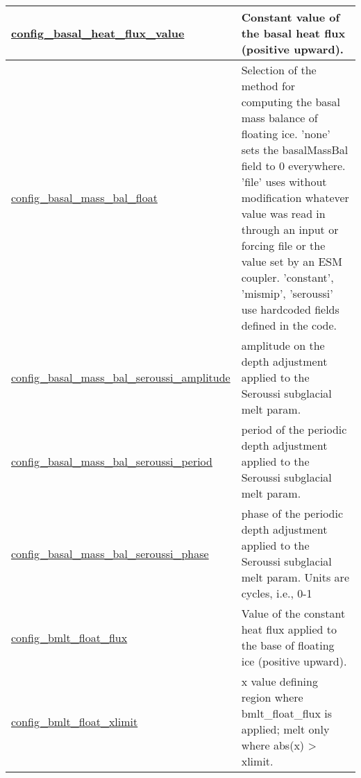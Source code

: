 {\begin{center}
\begin{longtable}{| p{2.0in} || p{4.0in} |}
    \hline
    \hyperref[subsec:nm_sec_config_basal_heat_flux_value]{config\_basal\_heat\_flux\_value} & Constant value of the basal heat flux (positive upward). \\
    \hline
    \hyperref[subsec:nm_sec_config_basal_mass_bal_float]{config\_basal\_mass\_bal\_float} & Selection of the method for computing the basal mass balance of floating ice.  'none' sets the basalMassBal field to 0 everywhere.  'file' uses without modification whatever value was read in through an input or forcing file or the value set by an ESM coupler.  'constant', 'mismip', 'seroussi' use hardcoded fields defined in the code. \\
    \hline
    \hyperref[subsec:nm_sec_config_basal_mass_bal_seroussi_amplitude]{config\_basal\_mass\_bal\_\-seroussi\_amplitude} & amplitude on the depth adjustment applied to the Seroussi subglacial melt param. \\
    \hline
    \hyperref[subsec:nm_sec_config_basal_mass_bal_seroussi_period]{config\_basal\_mass\_bal\_\-seroussi\_period} & period of the periodic depth adjustment applied to the Seroussi subglacial melt param. \\
    \hline
    \hyperref[subsec:nm_sec_config_basal_mass_bal_seroussi_phase]{config\_basal\_mass\_bal\_\-seroussi\_phase} & phase of the periodic depth adjustment applied to the Seroussi subglacial melt param. Units are cycles, i.e., 0-1 \\
    \hline
    \hyperref[subsec:nm_sec_config_bmlt_float_flux]{config\_bmlt\_float\_flux} & Value of the constant heat flux applied to the base of floating ice (positive upward). \\
    \hline
    \hyperref[subsec:nm_sec_config_bmlt_float_xlimit]{config\_bmlt\_float\_xlimit} & x value defining region where bmlt\_float\_flux is applied; melt only where abs(x) > xlimit. \\
    \hline
\end{longtable}
\end{center}
}
